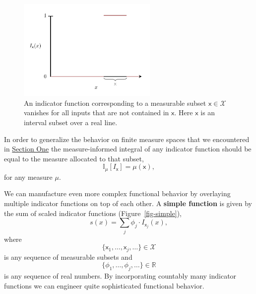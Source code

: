 \documentclass[
  letterpaper,
  DIV=11,
  numbers=noendperiod]{scrartcl}
\begin{document}
\begin{figure}

{\centering \includegraphics[width=0.6\textwidth,height=\textheight]{figures/indicator_function/indicator_function.pdf}

}

\caption{\label{fig-indicator}An indicator function corresponding to a
measurable subset \(\mathsf{x} \in \mathcal{X}\) vanishes for all inputs
that are not contained in \(\mathsf{x}\). Here \(\mathsf{x}\) is an
interval subset over a real line.}

\end{figure}

In order to generalize the behavior on finite measure spaces that we
encountered in \href{@sec:finite_integration}{Section One} the
measure-informed integral of any indicator function should be equal to
the measure allocated to that subset, \[
\mathbb{I}_{\mu}[ I_{\mathsf{x}} ]
=
\mu( \mathsf{x} ),
\] for any measure \(\mu\).

We can manufacture even more complex functional behavior by overlaying
multiple indicator functions on top of each other. A \textbf{simple
function} is given by the sum of scaled indicator functions
(Figure~\ref{fig-simple}), \[
s(x) = \sum_{j} \phi_{j} \cdot I_{\mathsf{x}_{j}}(x),
\] where \[
\{ \mathsf{x}_{1}, \ldots, \mathsf{x}_{j}, \ldots \} \in \mathcal{X}
\] is any sequence of measurable subsets and \[
\{ \phi_{1}, \ldots, \phi_{j}, \ldots \} \in \mathbb{R}
\] is any sequence of real numbers. By incorporating countably many
indicator functions we can engineer quite sophisticated functional
behavior.
\end{document}

